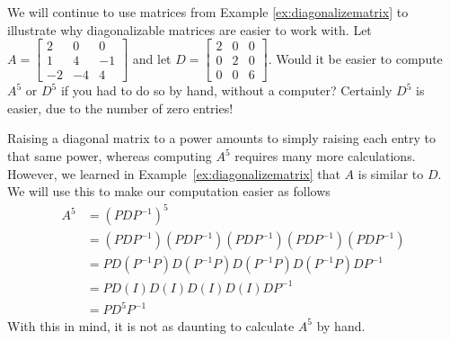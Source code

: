 \documentclass{ximera}
\begin{document}
\begin{exploration}\label{exp:motivate_diagonalization}
We will continue to use matrices from Example \ref{ex:diagonalizematrix} to illustrate why diagonalizable matrices are easier to work with.  Let $A=\begin{bmatrix}
2 & 0 & 0 \\
1 & 4 & -1 \\
-2 & -4 & 4
\end{bmatrix}$ and let $D=\begin{bmatrix}
2 & 0 & 0 \\
0 & 2 & 0 \\
0 & 0 & 6
\end{bmatrix}$.  
Would it be easier to compute $A^5$ or $D^5$ if you had to do so by hand, without a computer?  Certainly $D^5$ is easier, due to the number of zero entries!  %






Raising a diagonal matrix to a power amounts to simply raising each entry to that same power, whereas computing $A^5$ requires many more calculations.  However, we learned in Example~\ref{ex:diagonalizematrix} that $A$ is similar to $D$.  We will use this to make our computation easier as follows
\begin{align*}
    A^5&=\left(PDP^{-1}\right)^5 \\
       &=(PDP^{-1})(PDP^{-1})(PDP^{-1})(PDP^{-1})(PDP^{-1}) \\
       &=PD(P^{-1}P)D(P^{-1}P)D(P^{-1}P)D(P^{-1}P)DP^{-1} \\
       &=PD(I)D(I)D(I)D(I)DP^{-1} \\
       &=PD^5P^{-1}
\end{align*}
With this in mind, it is not as daunting to calculate $A^5$ by hand.  


\end{exploration}
\end{document}
